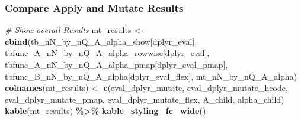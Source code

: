 \documentclass[
]{book}
\newenvironment{Shaded}{\begin{snugshade}}{\end{snugshade}}
\newcommand{\CommentTok}[1]{\textcolor[rgb]{0.56,0.35,0.01}{\textit{#1}}}
\newcommand{\KeywordTok}[1]{\textcolor[rgb]{0.13,0.29,0.53}{\textbf{#1}}}
\newcommand{\NormalTok}[1]{#1}
\newcommand{\OperatorTok}[1]{\textcolor[rgb]{0.81,0.36,0.00}{\textbf{#1}}}
\newcommand{\StringTok}[1]{\textcolor[rgb]{0.31,0.60,0.02}{#1}}
\begin{document}
\hypertarget{compare-apply-and-mutate-results}{%
\subsubsection{Compare Apply and Mutate Results}\label{compare-apply-and-mutate-results}}

\begin{Shaded}
\begin{Highlighting}[]
\CommentTok{\# Show overall Results}
\NormalTok{mt\_results \textless{}{-}}\StringTok{ }\KeywordTok{cbind}\NormalTok{(tb\_nN\_by\_nQ\_A\_alpha\_show[}\StringTok{\textquotesingle{}dplyr\_eval\textquotesingle{}}\NormalTok{],}
\NormalTok{                    tbfunc\_A\_nN\_by\_nQ\_A\_alpha\_rowwise[}\StringTok{\textquotesingle{}dplyr\_eval\textquotesingle{}}\NormalTok{],}
\NormalTok{                    tbfunc\_A\_nN\_by\_nQ\_A\_alpha\_pmap[}\StringTok{\textquotesingle{}dplyr\_eval\_pmap\textquotesingle{}}\NormalTok{],}
\NormalTok{                    tbfunc\_B\_nN\_by\_nQ\_A\_alpha[}\StringTok{\textquotesingle{}dplyr\_eval\_flex\textquotesingle{}}\NormalTok{],}
\NormalTok{                    mt\_nN\_by\_nQ\_A\_alpha)}
\KeywordTok{colnames}\NormalTok{(mt\_results) \textless{}{-}}\StringTok{ }\KeywordTok{c}\NormalTok{(}\StringTok{\textquotesingle{}eval\_dplyr\_mutate\textquotesingle{}}\NormalTok{,}
                          \StringTok{\textquotesingle{}eval\_dplyr\_mutate\_hcode\textquotesingle{}}\NormalTok{,}
                          \StringTok{\textquotesingle{}eval\_dplyr\_mutate\_pmap\textquotesingle{}}\NormalTok{,}
                          \StringTok{\textquotesingle{}eval\_dplyr\_mutate\_flex\textquotesingle{}}\NormalTok{,}
                          \StringTok{\textquotesingle{}A\_child\textquotesingle{}}\NormalTok{, }\StringTok{\textquotesingle{}alpha\_child\textquotesingle{}}\NormalTok{)}
\KeywordTok{kable}\NormalTok{(mt\_results) }\OperatorTok{\%\textgreater{}\%}
\StringTok{  }\KeywordTok{kable\_styling\_fc\_wide}\NormalTok{()}
\end{Highlighting}
\end{Shaded}

\begin{table}[!h]
\centering
{}
\end{table}
\end{document}
